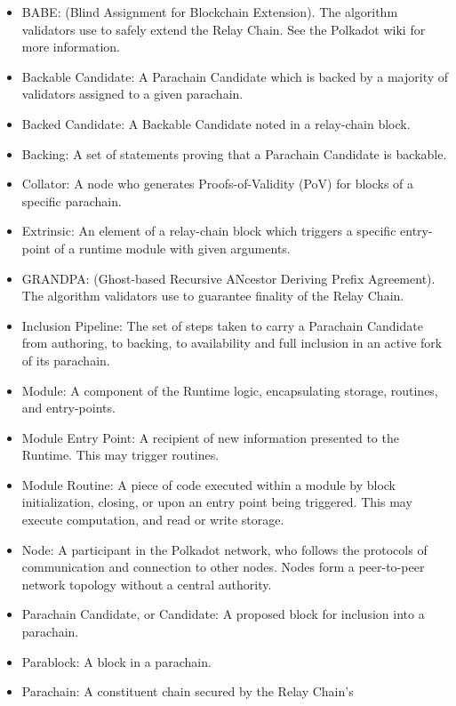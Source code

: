 \begin{itemize}
    \item BABE: (Blind Assignment for Blockchain Extension). The algorithm
    validators use to safely extend the Relay Chain. See the Polkadot wiki for
    more information.
    \item Backable Candidate: A Parachain Candidate which is backed by a
    majority of validators assigned to a given parachain.
    \item Backed Candidate: A Backable Candidate noted in a relay-chain block.
    \item Backing: A set of statements proving that a Parachain Candidate is
    backable.
    \item Collator: A node who generates Proofs-of-Validity (PoV) for blocks of
    a specific parachain.
    \item Extrinsic: An element of a relay-chain block which triggers a specific
    entry-point of a runtime module with given arguments.
    \item GRANDPA: (Ghost-based Recursive ANcestor Deriving Prefix Agreement).
    The algorithm validators use to guarantee finality of the Relay Chain.
    \item Inclusion Pipeline: The set of steps taken to carry a Parachain
    Candidate from authoring, to backing, to availability and full inclusion in
    an active fork of its parachain.
    \item Module: A component of the Runtime logic, encapsulating storage,
    routines, and entry-points.
    \item Module Entry Point: A recipient of new information presented to the
    Runtime. This may trigger routines.
    \item Module Routine: A piece of code executed within a module by block
    initialization, closing, or upon an entry point being triggered. This may
    execute computation, and read or write storage.
    \item Node: A participant in the Polkadot network, who follows the protocols
    of communication and connection to other nodes. Nodes form a peer-to-peer
    network topology without a central authority.
    \item Parachain Candidate, or Candidate: A proposed block for inclusion into
    a parachain.
    \item Parablock: A block in a parachain.
    \item Parachain: A constituent chain secured by the Relay Chain's

\end{itemize}
